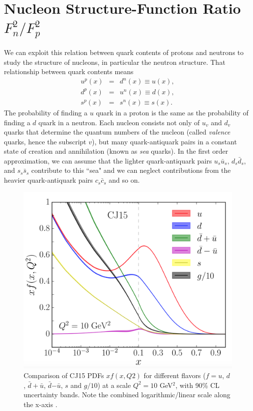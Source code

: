 \section{Nucleon Structure-Function Ratio $F^2_n/F^2_p$}
We can exploit this relation between quark contents of protons and neutrons to study the structure of nucleons, in particular the neutron structure. That relationship between quark contents means
\begin{eqnarray}
\nonumber
u^p(x) &=& d^n(x) \equiv u(x), \\
\nonumber
d^p(x) &=& u^n(x) \equiv d(x), \\
s^p(x) &=& s^n(x) \equiv s(x).
\end{eqnarray}
The probability of finding a $u$ quark in a proton is the same as the probability of finding a $d$ quark in a neutron. Each nucleon consists not only of $u_v$ and $d_v$ quarks that determine the quantum numbers of the nucleon (called \textit{valence} quarks, hence the subscript $v$), but many quark-antiquark pairs in a constant state of creation and annihilation (known as \textit{sea} quarks). In the first order approximation, we can assume that the lighter quark-antiquark pairs $u_s\bar{u}_s$, $d_s\bar{d}_s$, and $s_s\bar{s}_s$ contribute to this ``sea" and we can neglect contributions from the heavier quark-antiquark pairs $c_s\bar{c}_s$ and so on.

\begin{figure}[h!]
	\centering
	\includegraphics[width=0.9\linewidth]{figures/xf_x.png}
	\caption[Comparison of CJ15 PDFs $xf(x,Q2)$ for different flavors ($f = u$, $d$, $\bar{d} + \bar{u}$, $\bar{d}$$- \bar{u}$, $s$ and $g/10$).]{Comparison of CJ15 PDFs $xf(x,Q2)$ for different flavors ($f = u$, $d$, $\bar{d} + \bar{u}$, $\bar{d}$$- \bar{u}$, $s$ and $g/10$) at a scale $Q^2 = 10$ GeV$^2$, with 90\% CL uncertainty bands. Note the combined logarithmic/linear scale along the x-axis \cite{CJ15}.}
	\label{fig:xf_x}
\end{figure}

